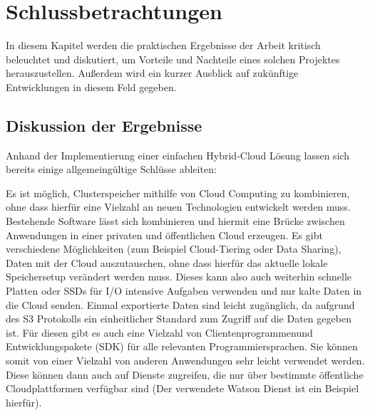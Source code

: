 \chapter{Schlussbetrachtungen}\label{ch:conclusion}

In diesem Kapitel werden die praktischen Ergebnisse der Arbeit kritisch beleuchtet und diskutiert, um Vorteile und Nachteile eines solchen Projektes herauszustellen. Außerdem wird ein kurzer Ausblick auf zukünftige Entwicklungen in diesem Feld gegeben.

\section{Diskussion der Ergebnisse}
Anhand der Implementierung einer einfachen Hybrid-Cloud Lösung lassen sich bereits einige allgemeingültige Schlüsse ableiten:

Es ist möglich, Clusterspeicher mithilfe von Cloud Computing zu kombinieren, ohne dass hierfür eine Vielzahl an neuen Technologien entwickelt werden muss. Bestehende Software lässt sich kombinieren und hiermit eine Brücke zwischen Anwendungen in einer privaten und öffentlichen Cloud erzeugen. Es gibt verschiedene Möglichkeiten (zum Beispiel Cloud-Tiering oder Data Sharing), Daten mit der Cloud auszutauschen, ohne dass hierfür das aktuelle lokale Speichersetup verändert werden muss.
Dieses kann also auch weiterhin schnelle Platten oder \acp{SSD} für I/O intensive Aufgaben verwenden und nur kalte Daten in die Cloud senden.
Einmal exportierte Daten sind leicht zugänglich, da aufgrund des \ac{S3} Protokolls ein einheitlicher Standard zum Zugriff auf die Daten gegeben ist. Für diesen gibt es auch eine Vielzahl von Clientenprogrammenund Entwicklungspakete (SDK) für alle relevanten Programmiersprachen.
Sie können somit von einer Vielzahl von anderen Anwendungen sehr leicht verwendet werden. Diese können dann auch auf Dienste zugreifen, die nur über bestimmte öffentliche Cloudplattformen verfügbar sind (Der verwendete Watson Dienst ist ein Beispiel hierfür).

